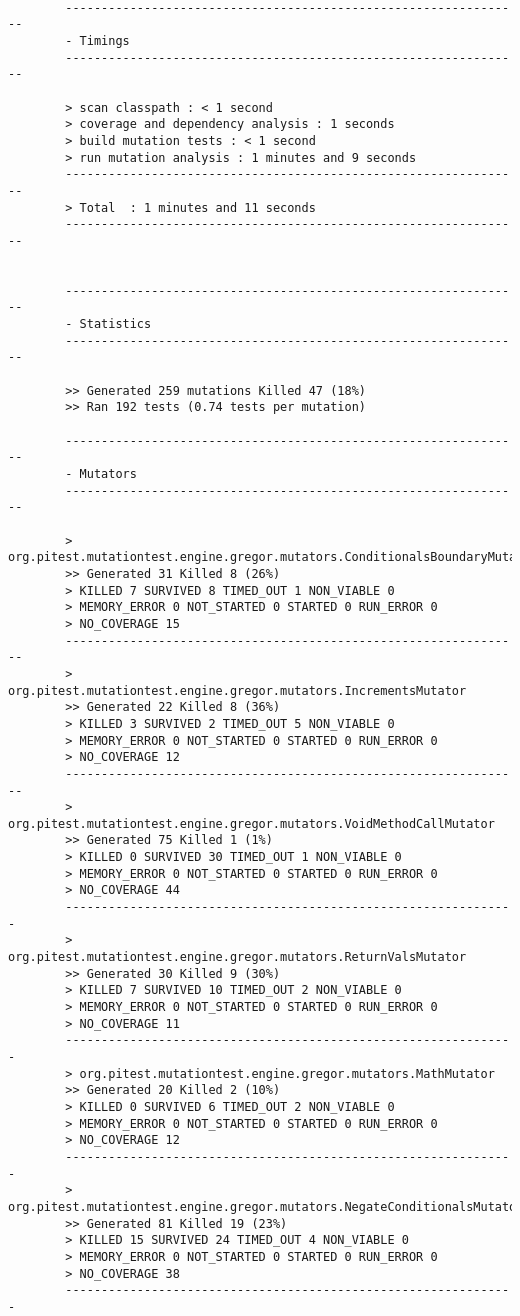 		\begin{lstlisting}

		----------------------------------------------------------------
		- Timings
		----------------------------------------------------------------

		> scan classpath : < 1 second
		> coverage and dependency analysis : 1 seconds
		> build mutation tests : < 1 second
		> run mutation analysis : 1 minutes and 9 seconds
		----------------------------------------------------------------
		> Total  : 1 minutes and 11 seconds
		----------------------------------------------------------------


		----------------------------------------------------------------
		- Statistics
		----------------------------------------------------------------

		>> Generated 259 mutations Killed 47 (18%)
		>> Ran 192 tests (0.74 tests per mutation)

		----------------------------------------------------------------
		- Mutators
		----------------------------------------------------------------

		> org.pitest.mutationtest.engine.gregor.mutators.ConditionalsBoundaryMutator
		>> Generated 31 Killed 8 (26%)
		> KILLED 7 SURVIVED 8 TIMED_OUT 1 NON_VIABLE 0
		> MEMORY_ERROR 0 NOT_STARTED 0 STARTED 0 RUN_ERROR 0
		> NO_COVERAGE 15
		----------------------------------------------------------------
		> org.pitest.mutationtest.engine.gregor.mutators.IncrementsMutator
		>> Generated 22 Killed 8 (36%)
		> KILLED 3 SURVIVED 2 TIMED_OUT 5 NON_VIABLE 0
		> MEMORY_ERROR 0 NOT_STARTED 0 STARTED 0 RUN_ERROR 0
		> NO_COVERAGE 12
		----------------------------------------------------------------
		> org.pitest.mutationtest.engine.gregor.mutators.VoidMethodCallMutator
		>> Generated 75 Killed 1 (1%)
		> KILLED 0 SURVIVED 30 TIMED_OUT 1 NON_VIABLE 0
		> MEMORY_ERROR 0 NOT_STARTED 0 STARTED 0 RUN_ERROR 0
		> NO_COVERAGE 44 
		---------------------------------------------------------------
		> org.pitest.mutationtest.engine.gregor.mutators.ReturnValsMutator
		>> Generated 30 Killed 9 (30%)
		> KILLED 7 SURVIVED 10 TIMED_OUT 2 NON_VIABLE 0
		> MEMORY_ERROR 0 NOT_STARTED 0 STARTED 0 RUN_ERROR 0
		> NO_COVERAGE 11 
		---------------------------------------------------------------
		> org.pitest.mutationtest.engine.gregor.mutators.MathMutator
		>> Generated 20 Killed 2 (10%)
		> KILLED 0 SURVIVED 6 TIMED_OUT 2 NON_VIABLE 0
		> MEMORY_ERROR 0 NOT_STARTED 0 STARTED 0 RUN_ERROR 0
		> NO_COVERAGE 12
		---------------------------------------------------------------
		> org.pitest.mutationtest.engine.gregor.mutators.NegateConditionalsMutator
		>> Generated 81 Killed 19 (23%)
		> KILLED 15 SURVIVED 24 TIMED_OUT 4 NON_VIABLE 0
		> MEMORY_ERROR 0 NOT_STARTED 0 STARTED 0 RUN_ERROR 0
		> NO_COVERAGE 38
		---------------------------------------------------------------

	\end{lstlisting}
